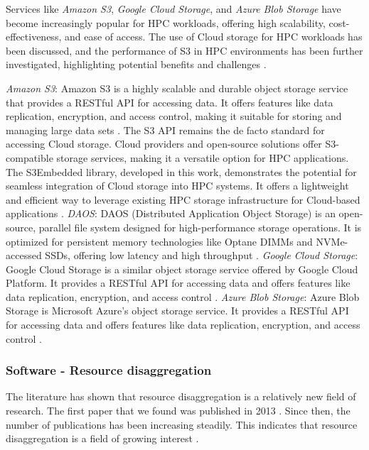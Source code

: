     Services like \textit{Amazon S3}, \textit{Google Cloud Storage}, and \textit{Azure Blob Storage} have become increasingly popular for HPC workloads, offering high scalability, cost-effectiveness, and ease of access. The use of Cloud storage for HPC workloads has been discussed, \cite{guidi_10_2021, guidi2021evaluation} and the performance of S3 in HPC environments has been further investigated, highlighting potential benefits and challenges \cite{gadban2021s3embedded, gadban2020http}.

    \textit{Amazon S3}: Amazon S3 is a highly scalable and durable object storage service that provides a RESTful API for accessing data. It offers features like data replication, encryption, and access control, making it suitable for storing and managing large data sets \cite{gadban2021s3embedded, guidi2021evaluation}. The S3 API remains the de facto standard for accessing Cloud storage. Cloud providers and open-source solutions offer S3-compatible storage services, making it a versatile option for HPC applications. The S3Embedded library, developed in this work, demonstrates the potential for seamless integration of Cloud storage into HPC systems. It offers a lightweight and efficient way to leverage existing HPC storage infrastructure for Cloud-based applications \cite{gadban2021s3embedded}.
    \textit{DAOS}: DAOS (Distributed Application Object Storage) is an open-source, parallel file system designed for high-performance storage operations. It is optimized for persistent memory technologies like Optane DIMMs and NVMe-accessed SSDs, offering low latency and high throughput \cite{wu2019daos, lofstead2016daos}.
    \textit{Google Cloud Storage}: Google Cloud Storage is a similar object storage service offered by Google Cloud Platform. It provides a RESTful API for accessing data and offers features like data replication, encryption, and access control \cite{gadban_investigating_2020, guidi_10_2021}.
    \textit{Azure Blob Storage}: Azure Blob Storage is Microsoft Azure’s object storage service. It provides a RESTful API for accessing data and offers features like data replication, encryption, and access control \cite{guidi_10_2021, endo_consideration_2022}.


    \subsubsection{Software - Resource disaggregation}

    The literature has shown that resource disaggregation is a relatively new field of research. The first paper that we found was published in 2013 \cite{barroso_resource_2013}. Since then, the number of publications has been increasing steadily. This indicates that resource disaggregation is a field of growing interest \cite{michelogiannakis_efficient_2023, michelogiannakis_case_2022, copik_software_2024}.


